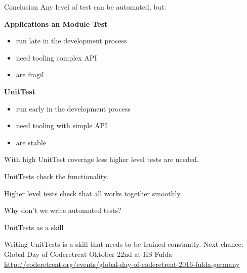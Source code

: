 \documentclass[SoftwareQuality.tex]{subfiles}
\begin{document}
\begin{frame}{Conclusion} 
Any level of test can be automated, but:
\vfill

\textbf{Applications an Module  Test}
\begin{itemize}
\item run late in the development process
\item need tooling complex API
\item are fragil
\end{itemize}

\textbf{UnitTest}
\begin{itemize}
\item run early in the development process
\item need tooling with simple API
\item are stable
\end{itemize}

With high UnitTest coverage less higher level  tests are needed.

UnitTests check the functionality.

Higher level tests check that all works together smoothly.

\end{frame}

\begin{frame}{Why don't we write automated tests?} 
\pause
{}
\end{frame}

\begin{frame}{UnitTests as a skill} 

{\Huge
Writing UnitTests is a skill that needs to be trained constantly.}
\vfill
Next chance: 
\\Global Day of Coderetreat Oktober 22nd at HS Fulda\\
\footnotesize\url{http://coderetreat.org/events/global-day-of-coderetreat-2016-fulda-germany}

\end{frame}
\end{document}
